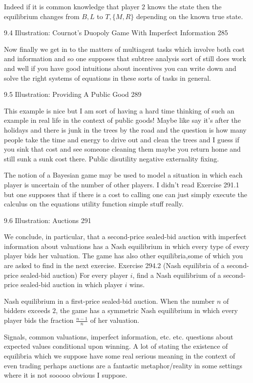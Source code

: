 Indeed if it is common knowledge that player $2$ knows the state then the equilibrium changes from $B,L$ to $T,\{M,R\}$ depending on the known true state.

9.4 Illustration: Cournot's Duopoly Game With Imperfect Information 285

Now finally we get in to the matters of multiagent tasks which involve both cost and information and so one supposes that subtree analysis sort of still does work and well if you have good intuitions about incentives you can write down and solve the right systems of equations in these sorts of tasks in general.

9.5 Illustration: Providing A Public Good 289

This example is nice but I am sort of having a hard time thinking of such an example in real life in the context of public goods! Maybe like say it's after the holidays and there is junk in the trees by the road and the question is how many people take the time and energy to drive out and clean the trees and I guess if you sink that cost and see someone cleaning them maybe you return home and still sunk a sunk cost there. Public disutility negative externality fixing.

The notion of a Bayesian game may be used to model a situation in which each player is uncertain of the number of other players. I didn't read Exercise 291.1 but one supposes that if there is a cost to calling one can just simply execute the calculus on the equations utility function simple stuff really.

9.6 Illustration: Auctions 291

We conclude, in particular, that a second-price sealed-bid auction with imperfect information about valuations has a Nash equilibrium in which every type of every player bids her valuation. The game has also other equilibria,some of which you are asked to find in the next exercise. Exercise 294.2 (Nash equilibria of a second-price sealed-bid auction) For every player $i$, find a Nash equilibrium of a second-price sealed-bid auction in which player $i$ wins.

Nash equilibrium in a first-price sealed-bid auction. When the number $n$ of bidders exceeds $2$, the game has a symmetric Nash equilibrium in which every player bids the fraction $\frac{n-1}{n}$ of her valuation.

Signals, common valuations, imperfect information, etc. etc. questions about expected values conditional upon winning. A lot of stating the existence of equilibria which we suppose have some real serious meaning in the context of even trading perhaps auctions are a fantastic metaphor/reality in some settings where it is not sooooo obvious I suppose.

